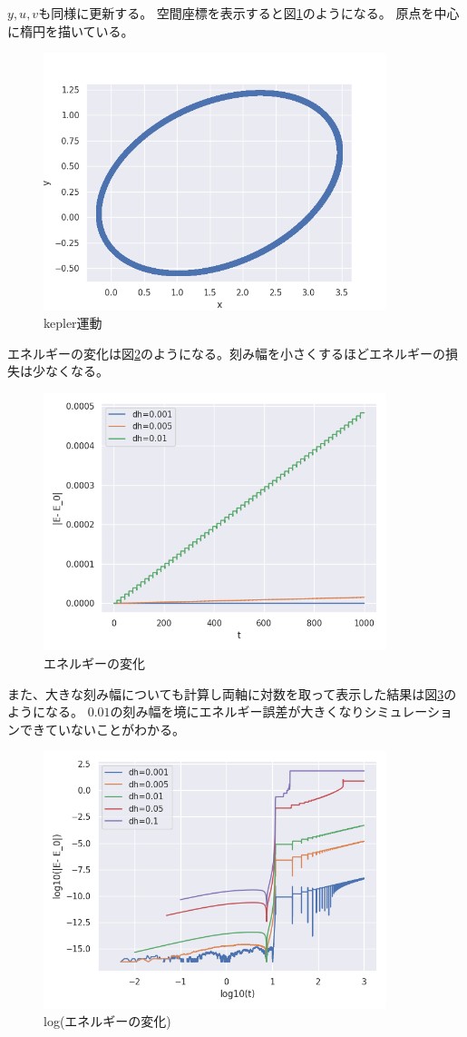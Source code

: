 \documentclass{jsarticle}
\begin{document}
$y,u,v$も同様に更新する。
空間座標を表示すると図\ref{fig:kepler}のようになる。
原点を中心に楕円を描いている。
\begin{figure}[htbp]
    \includegraphics[clip,width=10.0cm]{./kepler.png}
    \caption{kepler運動}
    \label{fig:kepler}
\end{figure}
エネルギーの変化は図\ref{fig:2}のようになる。刻み幅を小さくするほどエネルギーの損失は少なくなる。
\begin{figure}[htbp]
    \includegraphics[clip,width=10.0cm]{./energy.png}
    \caption{エネルギーの変化}
    \label{fig:2}
\end{figure}
また、大きな刻み幅についても計算し両軸に対数を取って表示した結果は図\ref{fig:3}のようになる。
$0.01$の刻み幅を境にエネルギー誤差が大きくなりシミュレーションできていないことがわかる。
\begin{figure}[htbp]
    \includegraphics[clip,width=10.0cm]{./energy_log.png}
    \caption{log(エネルギーの変化)}
    \label{fig:3}
\end{figure}
\end{document}
